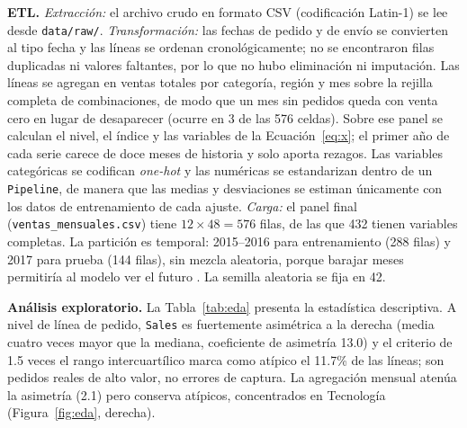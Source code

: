 \documentclass[pdflatex,sn-mathphys-num]{sn-jnl}
\begin{document}
\textbf{ETL.} \textit{Extracción:} el archivo crudo en formato CSV (codificación Latin-1) se lee desde \texttt{data/raw/}. \textit{Transformación:} las fechas de pedido y de envío se convierten al tipo fecha y las líneas se ordenan cronológicamente; no se encontraron filas duplicadas ni valores faltantes, por lo que no hubo eliminación ni imputación. Las líneas se agregan en ventas totales por categoría, región y mes sobre la rejilla completa de combinaciones, de modo que un mes sin pedidos queda con venta cero en lugar de desaparecer (ocurre en 3 de las 576 celdas). Sobre ese panel se calculan el nivel, el índice y las variables de la Ecuación~\eqref{eq:x}; el primer año de cada serie carece de doce meses de historia y solo aporta rezagos. Las variables categóricas se codifican \emph{one-hot} y las numéricas se estandarizan dentro de un \texttt{Pipeline}, de manera que las medias y desviaciones se estiman únicamente con los datos de entrenamiento de cada ajuste. \textit{Carga:} el panel final (\texttt{ventas\_mensuales.csv}) tiene $12\times48=576$ filas, de las que 432 tienen variables completas. La partición es temporal: 2015--2016 para entrenamiento (288 filas) y 2017 para prueba (144 filas), sin mezcla aleatoria, porque barajar meses permitiría al modelo ver el futuro \cite{bergmeir2018,cerqueira2020}. La semilla aleatoria se fija en 42.

\textbf{Análisis exploratorio.} La Tabla~\ref{tab:eda} presenta la estadística descriptiva. A nivel de línea de pedido, \texttt{Sales} es fuertemente asimétrica a la derecha (media cuatro veces mayor que la mediana, coeficiente de asimetría 13.0) y el criterio de 1.5 veces el rango intercuartílico marca como atípico el 11.7\% de las líneas; son pedidos reales de alto valor, no errores de captura. La agregación mensual atenúa la asimetría (2.1) pero conserva atípicos, concentrados en Tecnología (Figura~\ref{fig:eda}, derecha).
\end{document}
